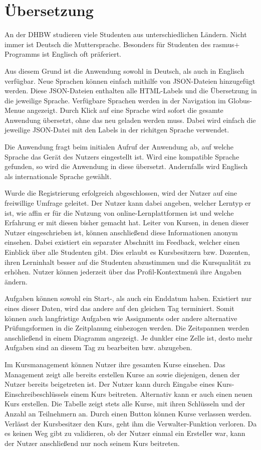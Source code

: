 \section{Übersetzung}

An der DHBW studieren viele Studenten aus unterschiedlichen Ländern.
Nicht immer ist Deutsch die Muttersprache.
Besonders für Studenten des rasmus+ Programms ist Englisch oft präferiert.

Aus diesem Grund ist die Anwendung sowohl in Deutsch, als auch in Englisch verfügbar.
Neue Sprachen können einfach mithilfe von JSON-Dateien hinzugefügt werden.
Diese JSON-Dateien enthalten alle HTML-Labels und die Übersetzung in die jeweilige Sprache. 
Verfügbare Sprachen werden in der Navigation im Globus-Menue angezeigt.
Durch Klick auf eine Sprache wird sofort die gesamte Anwendung übersetzt, ohne das neu geladen werden muss.
Dabei wird einfach die jeweilige JSON-Datei mit den Labels in der richitgen Sprache verwendet.

Die Anwendung fragt beim initialen Aufruf der Anwendung ab, auf welche Sprache das Gerät des Nutzers eingestellt ist.
Wird eine kompatible Sprache gefunden, so wird die Anwendung in diese übersetzt.
Andernfalls wird Englisch als internationale Sprache gewählt.

Wurde die Registrierung erfolgreich abgeschlossen, wird der Nutzer auf eine freiwillige Umfrage geleitet.
Der Nutzer kann dabei angeben, welcher Lerntyp er ist, wie affin er für die Nutzung von online-Lernplattformen ist und welche Erfahrung er mit diesen bisher gemacht hat.
Leiter von Kursen, in denen dieser Nutzer eingeschrieben ist, können anschließend diese Informationen anonym einsehen.
Dabei existiert ein separater Abschnitt im Feedback, welcher einen Einblick über alle Studenten gibt.
Dies erlaubt es Kursbesitzern bzw. Dozenten, ihren Lerninhalt besser auf die Studenten abzustimmen und die Kursqualität zu erhöhen.
Nutzer können jederzeit über das Profil-Kontextmenü ihre Angaben ändern.

Aufgaben können sowohl ein Start-, als auch ein Enddatum haben.
Existiert nur eines dieser Daten, wird das andere auf den gleichen Tag terminiert.
Somit können auch langfristige Aufgaben wie Assignments oder andere alternative Prüfungsformen in die Zeitplanung einbezogen werden.
Die Zeitspannen werden anschließend in einem Diagramm angezeigt.
Je dunkler eine Zelle ist, desto mehr Aufgaben sind an diesem Tag zu bearbeiten bzw. abzugeben.

Im Kursmanagement können Nutzer ihre gesamten Kurse einsehen.
Das Management zeigt alle bereits erstellen Kurse an sowie diejenigen, denen der Nutzer bereits beigetreten ist.
Der Nutzer kann durch Eingabe eines Kurs-Einschreibeschlüssels einem Kurs beitreten.
Alternativ kann er auch einen neuen Kurs erstellen.
Die Tabelle zeigt stets alle Kurse, mit ihren Schlüsseln und der Anzahl an Teilnehmern an.
Durch einen Button können Kurse verlassen werden.
Verlässt der Kursbesitzer den Kurs, geht ihm die Verwalter-Funktion verloren.
Da es keinen Weg gibt zu validieren, ob der Nutzer einmal ein Ersteller war, kann der Nutzer anschließend nur noch seinem Kurs beitreten.





